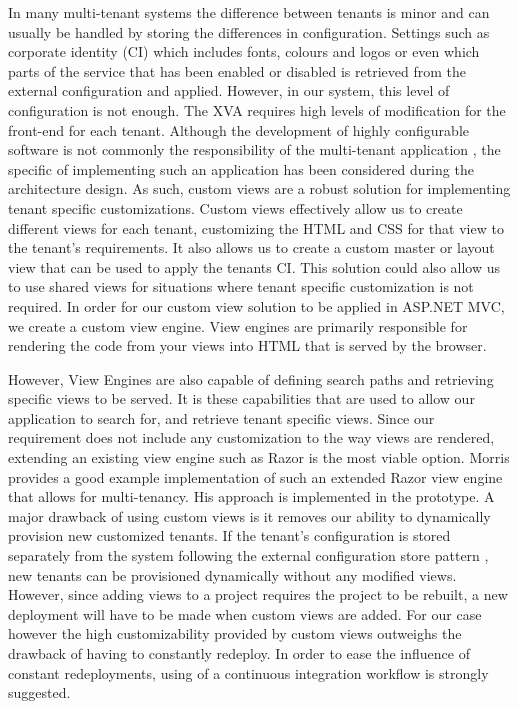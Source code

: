 In many multi-tenant systems the difference between tenants is minor and can usually be handled by storing the differences in configuration. Settings such as corporate identity (CI) which includes fonts, colours and logos or even which parts of the service that has been enabled or disabled is retrieved from the external configuration and applied. However, in our system, this level of configuration is not enough. The XVA requires high levels of modification for the front-end for each tenant. Although the development of highly configurable software is not commonly the responsibility of the multi-tenant application \cite{Krebs2012}, the specific of implementing such an application has been considered during the architecture design. As such, custom views are a robust solution for implementing tenant specific customizations. Custom views effectively allow us to create different views for each tenant, customizing the HTML and CSS for that view to the tenant's requirements. It also allows us to create a custom master or layout view that can be used to apply the tenants CI. This solution could also allow us to use shared views for situations where tenant specific customization is not required. In order for our custom view solution to be applied in ASP.NET MVC, we create a custom view engine. View engines are primarily responsible for rendering the code from your views into HTML that is served by the browser.

However, View Engines are also capable of defining search paths and retrieving specific views to be served. It is these capabilities that are used to allow our application to search for, and retrieve tenant specific views. Since our requirement does not include any customization to the way views are rendered, extending an existing view engine such as Razor is the most viable option. Morris \cite{Morris} provides a good example implementation of such an extended Razor view engine that allows for multi-tenancy. His approach is implemented in the prototype. A major drawback of using custom views is it removes our ability to dynamically provision new customized tenants. If the tenant's configuration is stored separately from the system following the external configuration store pattern \cite{Swanson}, new tenants can be provisioned dynamically without any modified views. However, since adding views to a project requires the project to be rebuilt, a new deployment will have to be made when custom views are added. For our case however the high customizability provided by custom views outweighs the drawback of having to constantly redeploy. In order to ease the influence of constant redeployments, using of a continuous integration workflow is strongly suggested.


